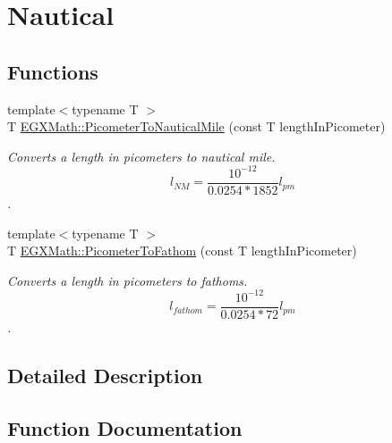 \hypertarget{group___e_g_x_math-_conversions-_length_conversions-_picometer-_nautical}{}\section{Nautical}
\label{group___e_g_x_math-_conversions-_length_conversions-_picometer-_nautical}
\subsection*{Functions}
\begin{DoxyCompactItemize}
\item 
{\footnotesize template$<$typename T $>$ }\\T \mbox{\hyperlink{group___e_g_x_math-_conversions-_length_conversions-_picometer-_nautical_ga7127ef6c7c68736b7a24d2c65b8ac858}{E\+G\+X\+Math\+::\+Picometer\+To\+Nautical\+Mile}} (const T length\+In\+Picometer)
\begin{DoxyCompactList}\small\item\em Converts a length in picometers to nautical mile. \[ l_{NM}= \frac{10^{-12}}{0.0254 * 1852} l_{pm} \]. \end{DoxyCompactList}\item 
{\footnotesize template$<$typename T $>$ }\\T \mbox{\hyperlink{group___e_g_x_math-_conversions-_length_conversions-_picometer-_nautical_ga1d8f092a0b6d47c4eaac5d9d19512d84}{E\+G\+X\+Math\+::\+Picometer\+To\+Fathom}} (const T length\+In\+Picometer)
\begin{DoxyCompactList}\small\item\em Converts a length in picometers to fathoms. \[ l_{fathom}= \frac{10^{-12}}{0.0254 * 72} l_{pm} \]. \end{DoxyCompactList}\end{DoxyCompactItemize}


\subsection{Detailed Description}


\subsection{Function Documentation}
\mbox{\label{group___e_g_x_math-_conversions-_length_conversions-_picometer-_nautical_ga1d8f092a0b6d47c4eaac5d9d19512d84}} 
